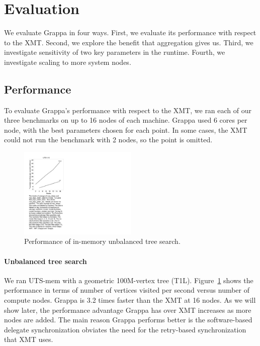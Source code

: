 \section{Evaluation} \label{sec:evaluation}

We evaluate Grappa in four ways. First, we evaluate its performance
with respect to the XMT. Second, we explore the benefit that
aggregation gives us. Third, we investigate sensitivity of two key
parameters in the runtime. Fourth, we investigate scaling to more system nodes.

\subsection{Performance}

To evaluate Grappa's performance with respect to the XMT, we ran each
of our three benchmarks on up to 16 nodes of each machine. Grappa used
6 cores per node, with the best parameters chosen for each point. In
some cases, the XMT could not run the benchmark with 2 nodes, so the
point is omitted.

\begin{figure}[ht]
    \begin{center}
      \includegraphics[width=0.5\textwidth]{figs/uts_performance.pdf}
    \end{center}
    \caption{Performance of in-memory unbalanced tree search.}
    \label{fig:uts_compare}
\end{figure}

\paragraph{Unbalanced tree search} We ran UTS-mem with a geometric 100M-vertex tree
(T1L). Figure~\ref{fig:uts_compare} shows the performance in terms of
number of vertices visited per second versus number of compute
nodes. Grappa is 3.2 times faster than the XMT at 16 nodes.  As we will show later, the performance advantage Grappa has over XMT increases as more nodes are added.  The main reason Grappa performs better is the software-based delegate synchronization obviates the need for the retry-based synchronization that XMT uses.


